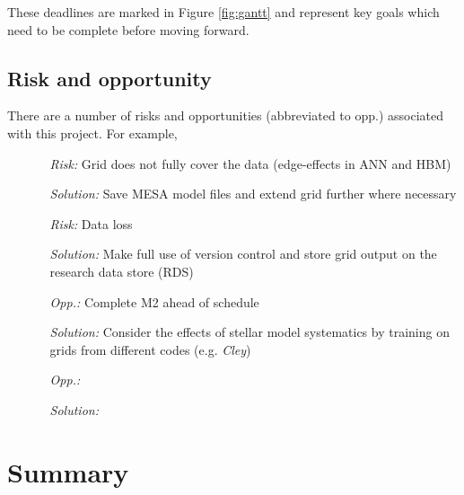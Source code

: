 \documentclass[twocolumn]{aastex63}
\begin{document}
These deadlines are marked in Figure \ref{fig:gantt} and represent key goals which need to be complete before moving forward.

\subsection{Risk and opportunity}

There are a number of risks and opportunities (abbreviated to opp.) associated with this project. For example,

\begin{itemize}
    \item[]
    \begin{itemize}
        \item[\textit{Risk:}] Grid does not fully cover the data (edge-effects in ANN and HBM)
        \item[\textit{Solution:}] Save MESA model files and extend grid further where necessary
    \end{itemize}
    \item[] 
    \begin{itemize}
        \item[\textit{Risk:}] Data loss
        \item[\textit{Solution:}] Make full use of version control and store grid output on the research data store (RDS)
    \end{itemize} 
\end{itemize}

\begin{itemize}
    \item[]
    \begin{itemize}
        \item[\textit{Opp.:}] Complete M2 ahead of schedule
        \item[\textit{Solution:}] Consider the effects of stellar model systematics by training on grids from different codes (e.g. \textit{Cley})
    \end{itemize}
    \item[]
    \begin{itemize}
        \item[\textit{Opp.:}]
        \item[\textit{Solution:}]
    \end{itemize}
\end{itemize}

\section{Summary}

{}

\end{document}
